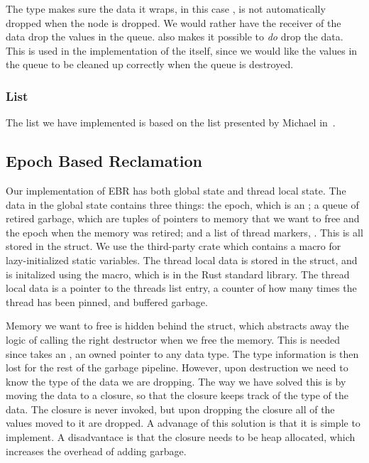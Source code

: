 \documentclass[b5paper]{report}
\begin{document}
The  type makes sure the data it wraps, in this case
, is not automatically dropped when the node is dropped. We would rather
have the receiver of the data drop the values in the queue. 
also makes it possible to \emph{do} drop the data. This is used in the
 implementation of the  itself, since we would like the
values in the queue to be cleaned up correctly when the queue is destroyed.

\subsubsection{List}

The list we have implemented is based on the list presented
by Michael in~\cite{michael2002high}.

\subsection{Epoch Based Reclamation}

Our implementation of EBR has both global state and thread local state. The data
in the global state contains three things: the epoch, which is an
; a queue of retired garbage, which are tuples of pointers to
memory that we want to free and the epoch when the memory was retired; and a
list of thread markers, . This is all stored in the
 struct. We use the third-party crate 
which contains a macro for lazy-initialized static variables.  The thread local
data is stored in the  struct, and is initalized using the
 macro, which is in the Rust standard library. The thread
local data is a pointer to the threads list entry, a counter of how many times
the thread has been pinned, and buffered garbage.

Memory we want to free is hidden behind the  struct, which
abstracts away the logic of calling the right destructor when we free the
memory.  This is needed since  takes an
, an owned pointer to any data type. The type information is then
lost for the rest of the garbage pipeline. However, upon destruction we need to
know the type of the data we are dropping. The way we have solved this is by
moving the data to a closure, so that the closure keeps track of the type of the
data.  The closure is never invoked, but upon dropping the closure all of the
values moved to it are dropped. A advanage of this solution is that it is simple
to implement. A disadvantace is that the closure needs to be heap allocated,
which increases the overhead of adding garbage.
\end{document}
